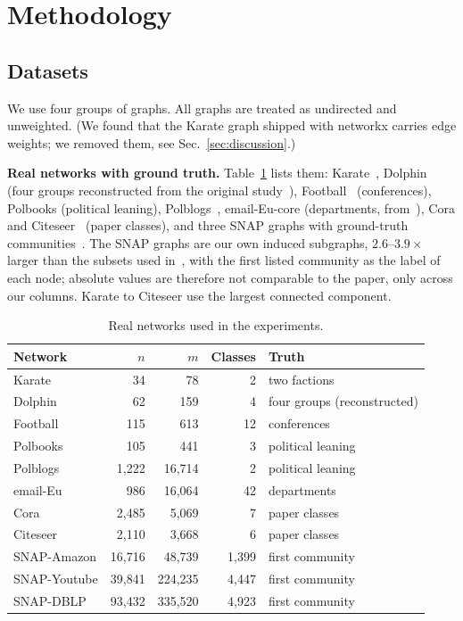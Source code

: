 \documentclass[conference]{IEEEtran}
\begin{document}
\section{Methodology}\label{sec:method}
\subsection{Datasets}\label{sec:data}
We use four groups of graphs. All graphs are treated as undirected and unweighted. (We found that the Karate graph shipped with networkx carries edge weights; we removed them, see Sec.~\ref{sec:discussion}.)

\textbf{Real networks with ground truth.} Table~\ref{tab:data} lists them: Karate~\cite{zachary1977}, Dolphin (four groups reconstructed from the original study~\cite{lusseau2003}), Football~\cite{girvan2002} (conferences), Polbooks (political leaning), Polblogs~\cite{adamic2005}, email-Eu-core (departments, from~\cite{yin2017}), Cora and Citeseer~\cite{sen2008} (paper classes), and three SNAP graphs with ground-truth communities~\cite{yang2012}. The SNAP graphs are our own induced subgraphs, $2.6$--$3.9\times$ larger than the subsets used in~\cite{kong2026}, with the first listed community as the label of each node; absolute values are therefore not comparable to the paper, only across our columns. Karate to Citeseer use the largest connected component.
\begin{table}[H]
\centering
\caption{Real networks used in the experiments.}
\label{tab:data}
\scriptsize
\begin{tabular}{lrrr>{\raggedright\arraybackslash}p{23mm}}
\toprule
Network & $n$ & $m$ & Classes & Truth \\
\midrule
Karate & 34 & 78 & 2 & two factions \\
Dolphin & 62 & 159 & 4 & four groups (reconstructed) \\
Football & 115 & 613 & 12 & conferences \\
Polbooks & 105 & 441 & 3 & political leaning \\
Polblogs & 1{,}222 & 16{,}714 & 2 & political leaning \\
email-Eu & 986 & 16{,}064 & 42 & departments \\
Cora & 2{,}485 & 5{,}069 & 7 & paper classes \\
Citeseer & 2{,}110 & 3{,}668 & 6 & paper classes \\
SNAP-Amazon & 16{,}716 & 48{,}739 & 1{,}399 & first community \\
SNAP-Youtube & 39{,}841 & 224{,}235 & 4{,}447 & first community \\
SNAP-DBLP & 93{,}432 & 335{,}520 & 4{,}923 & first community \\
\bottomrule
\end{tabular}
\end{table}
\end{document}
